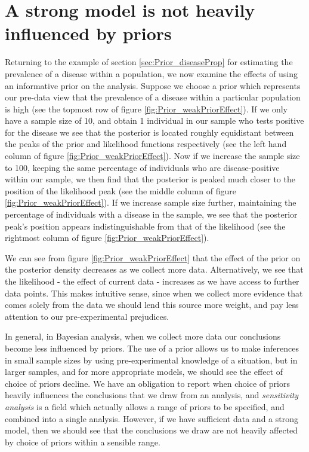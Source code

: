 \documentclass[11pt,fullpage]{book}
\begin{document}
\section{A strong model is not heavily influenced by priors}
Returning to the example of section \ref{sec:Prior_diseaseProp} for estimating the prevalence of a disease within a population, we now examine the effects of using an informative prior on the analysis. Suppose we choose a prior which represents our pre-data view that the prevalence of a disease within a particular population is high (see the topmost row of figure \ref{fig:Prior_weakPriorEffect}). If we only have a sample size of 10, and obtain 1 individual in our sample who tests positive for the disease we see that the posterior is located roughly equidistant between the peaks of the prior and likelihood functions respectively (see the left hand column of figure \ref{fig:Prior_weakPriorEffect}). Now if we increase the sample size to 100, keeping the same percentage of individuals who are disease-positive within our sample, we then find that the posterior is peaked much closer to the position of the likelihood peak (see the middle column of figure \ref{fig:Prior_weakPriorEffect}). If we increase sample size further, maintaining the percentage of individuals with a disease in the sample, we see that the posterior peak's position appears indistinguishable from that of the likelihood (see the rightmost column of figure \ref{fig:Prior_weakPriorEffect}). 

We can see from figure \ref{fig:Prior_weakPriorEffect} that the effect of the prior on the posterior density decreases as we collect more data. Alternatively, we see that the likelihood - the effect of current data  - increases as we have access to further data points. This makes intuitive sense, since when we collect more evidence that comes solely from the data we should lend this source more weight, and pay less attention to our pre-experimental prejudices.

In general, in Bayesian analysis, when we collect more data our conclusions become less influenced by priors. The use of a prior allows us to make inferences in small sample sizes by using pre-experimental knowledge of a situation, but in larger samples, and for more appropriate models, we should see the effect of choice of priors decline. We have an obligation to report when choice of priors heavily influences the conclusions that we draw from an analysis, and \textit{sensitivity analysis} is a field which actually allows a range of priors to be specified, and combined into a single analysis. However, if we have sufficient data and a strong model, then we should see that the conclusions we draw are not heavily affected by choice of priors within a sensible range.
\end{document}
